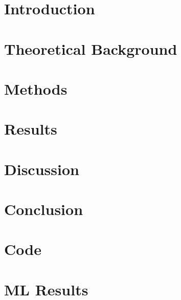 \documentclass[12pt, bibliography=totoc]{scrartcl}
\begin{document}
    \newpage
    \onehalfspacing


    \section{Introduction}
    \label{sec:introduction}
    


    \section{Theoretical Background}
    \label{sec:background}
    


    \section{Methods}
    \label{sec:methods}
    


    \section{Results}
    \label{sec:results}
    


    \section{Discussion}
    \label{sec:discussion}
    


    \section{Conclusion}
    \label{sec:conclusion}
    


    \newpage
    \small
    
    \normalsize

    \newpage
    \singlespacing
    \appendix


    \section{Code}\label{sec:code}
    
    \newpage


    \section{ML Results}\label{sec:ml_results}
    
\end{document}
